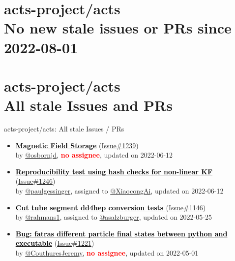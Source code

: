 \section{ acts-project/acts \\ No new stale issues or PRs since 2022-08-01 }



\section{ acts-project/acts \\ All stale Issues and PRs}
\begin{frame}[allowframebreaks]{ acts-project/acts: All stale Issues / PRs}
  \begin{itemize}
    
    \item\iss\prstale
    \hspace*{0.1em}
    \textbf{\href{https://github.com/acts-project/acts/issues/1239}{\textcolor{black}{Magnetic Field Storage}}}
    (\href{https://github.com/acts-project/acts/issues/1239}{Issue\#1239}) \\
    by \href{https://github.com/osbornjd}{@osbornjd}, {}\textbf{\textcolor{Red}{no assignee}}, updated on 2022-06-12

    \item\iss\prstale
    \hspace*{0.1em}
    \textbf{\href{https://github.com/acts-project/acts/issues/1246}{\textcolor{black}{Reproducibility test using hash checks for non-linear KF}}}
    (\href{https://github.com/acts-project/acts/issues/1246}{Issue\#1246}) \\
    by \href{https://github.com/paulgessinger}{@paulgessinger}, {}assigned to \href{https://github.com/XiaocongAi}{@XiaocongAi}, updated on 2022-06-12

    \item\iss\prstale
    \hspace*{0.1em}
    \textbf{\href{https://github.com/acts-project/acts/issues/1146}{\textcolor{black}{Cut tube segment dd4hep conversion tests }}}
    (\href{https://github.com/acts-project/acts/issues/1146}{Issue\#1146}) \\
    by \href{https://github.com/rahmans1}{@rahmans1}, {}assigned to \href{https://github.com/asalzburger}{@asalzburger}, updated on 2022-05-25

    \item\iss\prstale
    \hspace*{0.1em}
    \textbf{\href{https://github.com/acts-project/acts/issues/1221}{\textcolor{black}{Bug: fatras different particle final states between python and executable}}}
    (\href{https://github.com/acts-project/acts/issues/1221}{Issue\#1221}) \\
    by \href{https://github.com/CouthuresJeremy}{@CouthuresJeremy}, {}\textbf{\textcolor{Red}{no assignee}}, updated on 2022-05-01


\end{itemize}
\end{frame}
